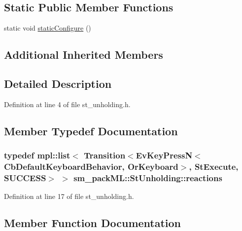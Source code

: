 \subsection*{Static Public Member Functions}
\begin{DoxyCompactItemize}
\item 
static void \hyperlink{structsm__packML_1_1StUnholding_af10ed2a8a3468eeff32c4466544c7efa}{static\+Configure} ()
\end{DoxyCompactItemize}
\subsection*{Additional Inherited Members}


\subsection{Detailed Description}


Definition at line 4 of file st\+\_\+unholding.\+h.



\subsection{Member Typedef Documentation}
\subsubsection[{\texorpdfstring{reactions}{reactions}}]{\setlength{\rightskip}{0pt plus 5cm}typedef mpl\+::list$<$ Transition$<$Ev\+Key\+PressN$<$Cb\+Default\+Keyboard\+Behavior, {\bf Or\+Keyboard}$>$, {\bf St\+Execute}, {\bf S\+U\+C\+C\+E\+SS}$>$ $>$ {\bf sm\+\_\+pack\+M\+L\+::\+St\+Unholding\+::reactions}}\hypertarget{structsm__packML_1_1StUnholding_a3818ebacf18ce5dd2351fdfa84254354}{}\label{structsm__packML_1_1StUnholding_a3818ebacf18ce5dd2351fdfa84254354}


Definition at line 17 of file st\+\_\+unholding.\+h.



\subsection{Member Function Documentation}
